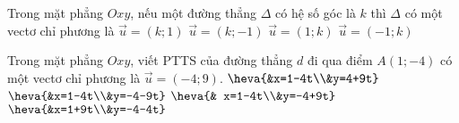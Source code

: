 \begin{ex}%
	Trong mặt phẳng $Oxy$, nếu một đường thẳng $\Delta $ có hệ số góc là $k$ thì $\Delta$ có một vectơ chỉ phương là
	\choice
	{$\overrightarrow{u}=(k;1)$}
	{$\overrightarrow{u}=(k;-1)$}
	{\True $\overrightarrow{u}=(1;k)$}
	{$\overrightarrow{u}=(-1;k)$}
\end{ex}

\begin{ex}%
	Trong mặt phẳng $Oxy$, viết PTTS của đường thẳng $d$ đi qua điểm $A(1;-4)$ có một vectơ chỉ phương là $\overrightarrow{u} =(-4;9)$.
	\choice
	{$\heva{&x=1-4t\\&y=4+9t}$}
	{$\heva{&x=1-4t\\&y=-4-9t}$}
	{\True $\heva{& x=1-4t\\&y=-4+9t}$}
	{$\heva{&x=1+9t\\&y=-4-4t}$}
\end{ex}

